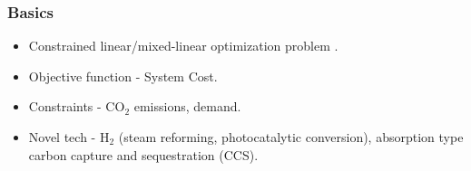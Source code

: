 \begin{frame}
  \frametitle{Basics}
        \begin{itemize}
        
        \item Constrained linear/mixed-linear optimization problem \cite{loulou_etsap-tiam:_2008}.
        
        \item Objective function - System Cost.
        
        \item Constraints - CO$_2$ emissions, demand.
        
        \item Novel tech - H$_2$ (steam reforming, photocatalytic conversion), absorption type carbon capture and sequestration (CCS)\cite{kato_energy_2016}.
        
        \end{itemize}
\end{frame}

%
